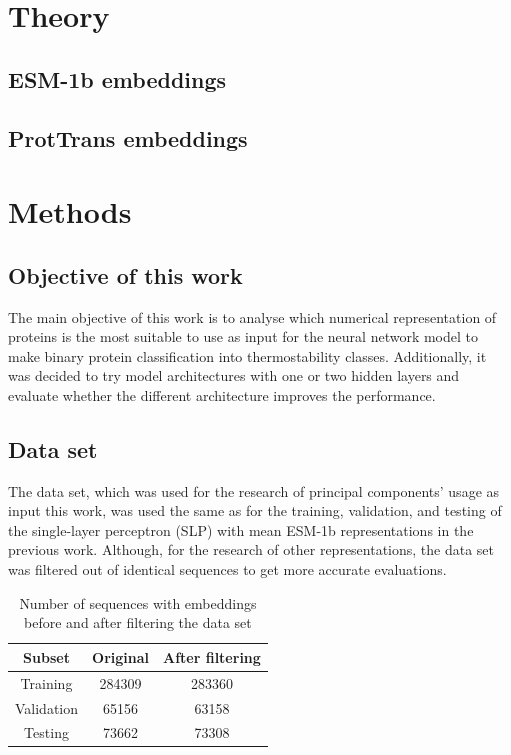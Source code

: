 \documentclass[12pt]{article}
\begin{document}
	\begin{otherlanguage}{lithuanian}
		
	\end{otherlanguage}
	
	\newpage

	\section{Theory}

	\subsection{ESM-1b embeddings}

	\subsection{ProtTrans embeddings}

	\newpage

	\section{Methods}

	\subsection{Objective of this work}

	The main objective of this work is to analyse 
	which numerical representation of proteins is the most 
	suitable to use as input for the neural network 
	model to make binary protein classification into thermostability
	classes. Additionally, it was decided to try model 
	architectures with one or two hidden layers and evaluate 
	whether the different architecture improves the 
	performance.

	\subsection{Data set}

	The data set, which was used for the research of principal components' 
	usage as input this work, was 
	used the same as for the training, validation, and testing of 
	the single-layer perceptron (SLP) with mean ESM-1b 
	representations in the previous work. Although, for the 
	research of other representations, the data set was 
	filtered out of identical sequences to 
	get more accurate evaluations.

	\begin{table}[h!]
		\caption{Number of sequences with embeddings before and after 
		filtering the data set}
		\vspace{0.2cm}
		\centering
		\begin{tabular}{ | c | c c | }
			\hline 
			Subset & Original & After filtering \\
			\hline 
			Training & 284309 & 283360 \\
			Validation & 65156 & 63158 \\
			Testing & 73662 & 73308 \\
			\hline    
		\end{tabular}
		\label{table:numberEmbeddings}
	\end{table}
\end{document}

